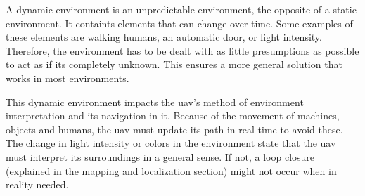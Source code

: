 A dynamic environment is an unpredictable environment, the opposite of a static environment. It containts elements that can change over time. Some examples of these elements are walking humans, an automatic door, or light intensity. Therefore, the environment has to be dealt with as little presumptions as possible to act as if its completely unknown. This ensures a more general solution that works in most environments.

This dynamic environment impacts the \acs{uav}'s method of environment interpretation and its navigation in it. Because of the movement of machines, objects and humans, the \acs{uav} must update its path in real time to avoid these. The change in light intensity or colors in the environment state that the \acs{uav} must interpret its surroundings in a general sense. If not, a loop closure (explained in the mapping and localization section) might not occur when in reality needed.